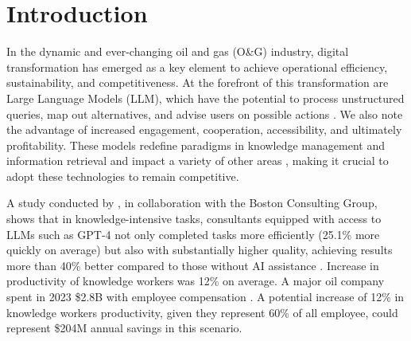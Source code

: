 
\chapter{Introduction}




    In the dynamic and ever-changing oil and gas (O\&G) industry,
    digital transformation has emerged as a key element to achieve operational efficiency, sustainability, and competitiveness. 
    At the forefront of this transformation are Large Language Models (LLM), which have the potential to process unstructured queries, map out alternatives, and advise users on possible actions \citep{Kar2023}. 
    We also note the advantage of increased engagement, cooperation, accessibility, and ultimately profitability. 
    These models redefine paradigms in knowledge management and information retrieval and impact a variety of other areas \citep{Eckroth2023}, making it crucial to adopt these technologies to remain competitive.    
    
    A study conducted by \citet{Dellacqua2023}, in collaboration with the Boston Consulting Group, shows that in knowledge-intensive tasks, consultants equipped with access to LLMs such as GPT-4 not only completed tasks more efficiently (25.1\% more quickly on average) but also with substantially higher quality, achieving results more than 40\% better compared to those without AI assistance \citep{Dellacqua2023}.
    Increase in productivity of knowledge workers was 12\% on average.    
    A major oil company spent in 2023 \$2.8B with employee compensation \citep{Petrobras2024}.
    A potential increase of 12\% in knowledge workers productivity, given they represent 60\% of all employee, could represent \$204M annual savings in this scenario. 
    
